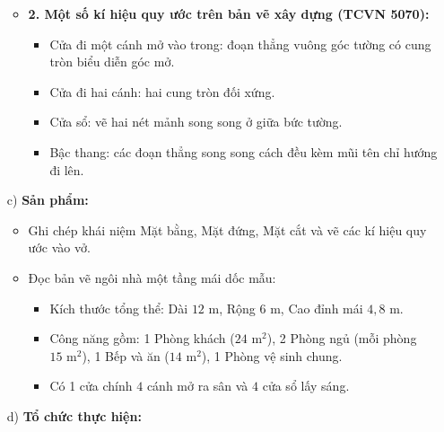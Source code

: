 \documentclass[12pt, a4paper]{article}
\begin{document}
\begin{itemize}[leftmargin=1.2cm]
\begin{itemize}[leftmargin=0.6cm]
        \item \textbf{2. Một số kí hiệu quy ước trên bản vẽ xây dựng (TCVN 5070):}
        \begin{itemize}
            \item Cửa đi một cánh mở vào trong: đoạn thẳng vuông góc tường có cung tròn biểu diễn góc mở.
            \item Cửa đi hai cánh: hai cung tròn đối xứng.
            \item Cửa sổ: vẽ hai nét mảnh song song ở giữa bức tường.
            \item Bậc thang: các đoạn thẳng song song cách đều kèm mũi tên chỉ hướng đi lên.
        \end{itemize}
    \end{itemize}

    \item[c)] \textbf{Sản phẩm:}
    \begin{itemize}[leftmargin=0.6cm]
        \item Ghi chép khái niệm Mặt bằng, Mặt đứng, Mặt cắt và vẽ các kí hiệu quy ước vào vở.
        \item Đọc bản vẽ ngôi nhà một tầng mái dốc mẫu:
        \begin{itemize}
            \item Kích thước tổng thể: Dài $12\text{ m}$, Rộng $6\text{ m}$, Cao đỉnh mái $4{,}8\text{ m}$.
            \item Công năng gồm: 1 Phòng khách ($24\text{ m}^2$), 2 Phòng ngủ (mỗi phòng $15\text{ m}^2$), 1 Bếp và ăn ($14\text{ m}^2$), 1 Phòng vệ sinh chung.
            \item Có 1 cửa chính $4$ cánh mở ra sân và $4$ cửa sổ lấy sáng.
        \end{itemize}
    \end{itemize}

    \item[d)] \textbf{Tổ chức thực hiện:}
\end{itemize}
\end{document}
